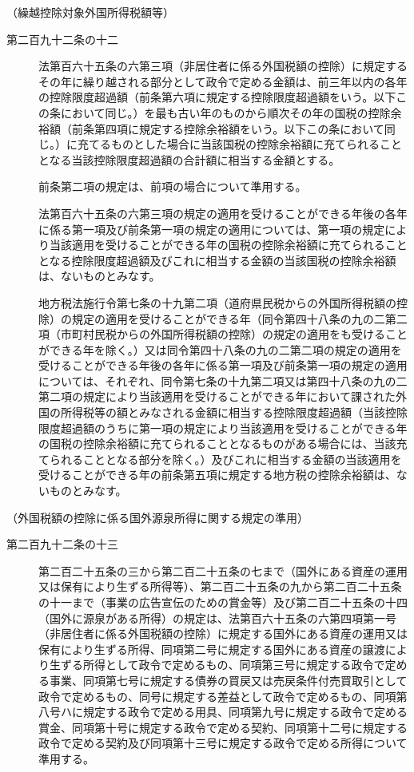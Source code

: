 \documentclass[twocolumn,a4j,10pt]{ltjtarticle}
\begin{document}
\noindent\hspace{10pt}（繰越控除対象外国所得税額等）
\begin{description}
\item[第二百九十二条の十二]法第百六十五条の六第三項（非居住者に係る外国税額の控除）に規定するその年に繰り越される部分として政令で定める金額は、前三年以内の各年の控除限度超過額（前条第六項に規定する控除限度超過額をいう。以下この条において同じ。）を最も古い年のものから順次その年の国税の控除余裕額（前条第四項に規定する控除余裕額をいう。以下この条において同じ。）に充てるものとした場合に当該国税の控除余裕額に充てられることとなる当該控除限度超過額の合計額に相当する金額とする。
\item[]前条第二項の規定は、前項の場合について準用する。
\item[]法第百六十五条の六第三項の規定の適用を受けることができる年後の各年に係る第一項及び前条第一項の規定の適用については、第一項の規定により当該適用を受けることができる年の国税の控除余裕額に充てられることとなる控除限度超過額及びこれに相当する金額の当該国税の控除余裕額は、ないものとみなす。
\item[]地方税法施行令第七条の十九第二項（道府県民税からの外国所得税額の控除）の規定の適用を受けることができる年（同令第四十八条の九の二第二項（市町村民税からの外国所得税額の控除）の規定の適用をも受けることができる年を除く。）又は同令第四十八条の九の二第二項の規定の適用を受けることができる年後の各年に係る第一項及び前条第一項の規定の適用については、それぞれ、同令第七条の十九第二項又は第四十八条の九の二第二項の規定により当該適用を受けることができる年において課された外国の所得税等の額とみなされる金額に相当する控除限度超過額（当該控除限度超過額のうちに第一項の規定により当該適用を受けることができる年の国税の控除余裕額に充てられることとなるものがある場合には、当該充てられることとなる部分を除く。）及びこれに相当する金額の当該適用を受けることができる年の前条第五項に規定する地方税の控除余裕額は、ないものとみなす。
\end{description}
\noindent\hspace{10pt}（外国税額の控除に係る国外源泉所得に関する規定の準用）
\begin{description}
\item[第二百九十二条の十三]第二百二十五条の三から第二百二十五条の七まで（国外にある資産の運用又は保有により生ずる所得等）、第二百二十五条の九から第二百二十五条の十一まで（事業の広告宣伝のための賞金等）及び第二百二十五条の十四（国外に源泉がある所得）の規定は、法第百六十五条の六第四項第一号（非居住者に係る外国税額の控除）に規定する国外にある資産の運用又は保有により生ずる所得、同項第二号に規定する国外にある資産の譲渡により生ずる所得として政令で定めるもの、同項第三号に規定する政令で定める事業、同項第七号に規定する債券の買戻又は売戻条件付売買取引として政令で定めるもの、同号に規定する差益として政令で定めるもの、同項第八号ハに規定する政令で定める用具、同項第九号に規定する政令で定める賞金、同項第十号に規定する政令で定める契約、同項第十二号に規定する政令で定める契約及び同項第十三号に規定する政令で定める所得について準用する。
\end{description}
\end{document}
